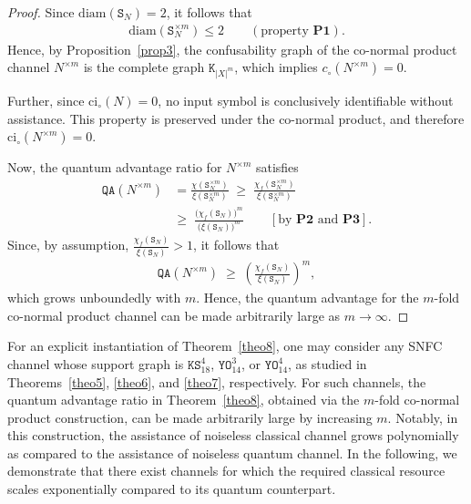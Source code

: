 \documentclass[12pt,a4paper]{article}
\begin{document}
\begin{proof}
Since $\mathrm{diam}(\mathtt{S}_N)=2$, it follows that 
\begin{align*}
\mathrm{diam}(\mathtt{S}_N^{\times m}) \le 2 \qquad (\text{property } \mathbf{P1}).   
\end{align*}
Hence, by Proposition~\ref{prop3}, the confusability graph of the co-normal product channel $N^{\times m}$ is the complete graph $\mathtt{K}_{|X|^m}$, which implies $c_\circ(N^{\times m}) = 0$. 

\noindent Further, since $\mathrm{ci}_\circ(N)=0$, no input symbol is conclusively identifiable without assistance. This property is preserved under the co-normal product, and therefore $\mathrm{ci}_\circ(N^{\times m}) = 0$.

\noindent Now, the quantum advantage ratio for $N^{\times m}$ satisfies
\begin{align*}
\mathtt{QA}(N^{\times m})&= \frac{\chi(\mathtt{S}_N^{\times m})}{\xi(\mathtt{S}_N^{\times m})}
\;\ge\; \frac{\chi_f(\mathtt{S}_N^{\times m})}{\xi(\mathtt{S}_N^{\times m})} \\
&\ge\; \frac{\big(\chi_f(\mathtt{S}_N)\big)^m}{\big(\xi(\mathtt{S}_N)\big)^m}
\qquad [\text{by } \mathbf{P2} \text{ and } \mathbf{P3}].
\end{align*}
Since, by assumption, $\frac{\chi_f(\mathtt{S}_N)}{\xi(\mathtt{S}_N)} > 1$, it follows that
\begin{align*}
\mathtt{QA}(N^{\times m}) \;\ge\; \left(\frac{\chi_f(\mathtt{S}_N)}{\xi(\mathtt{S}_N)}\right)^m,
\end{align*}
which grows unboundedly with $m$. Hence, the quantum advantage for the $m$-fold co-normal product channel can be made arbitrarily large as $m \to \infty$.
\end{proof}

\noindent For an explicit instantiation of Theorem~\ref{theo8}, one may consider any SNFC channel whose support graph is $\mathtt{KS}^{4}_{18}$, $\mathtt{YO}^{3}_{14}$, or $\mathtt{YO}^{4}_{14}$, as studied in Theorems~\ref{theo5}, \ref{theo6}, and \ref{theo7}, respectively. For such channels, the quantum advantage ratio in Theorem~\ref{theo8}, obtained via the $m$-fold co-normal product construction, can be made arbitrarily large by increasing $m$. Notably, in this construction, the  assistance of noiseless classical channel grows polynomially as compared to the assistance of noiseless quantum channel. In the following, we demonstrate that there exist channels for which the required classical resource scales exponentially compared to its quantum counterpart.      
\end{document}
